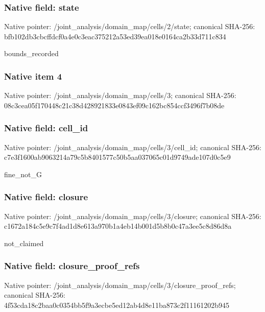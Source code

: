 \documentclass[10pt,a4paper]{article}
\begin{document}
\subsubsection{Native field: state}
Native pointer: /joint\_\allowbreak{}analysis/domain\_\allowbreak{}map/cells/2/state; canonical SHA-256: bfb102db3cbcffdcf0a4e0c3eac375212a53ed39ea018e0164ca2b33d711c834

\begingroup\raggedright\sloppy bounds\_\allowbreak{}recorded\par\endgroup

\subsubsection{Native item 4}
Native pointer: /joint\_\allowbreak{}analysis/domain\_\allowbreak{}map/cells/3; canonical SHA-256: 08c3cea05f170448c21c38d428921833e0843ef09c162bc854ccf3496f7b08de

\subsubsection{Native field: cell\_\allowbreak{}id}
Native pointer: /joint\_\allowbreak{}analysis/domain\_\allowbreak{}map/cells/3/cell\_\allowbreak{}id; canonical SHA-256: c7e3f1600ab9063214a79c5b8401577c50b5aa037065c01d9749ade107d0c5e9

\begingroup\raggedright\sloppy fine\_\allowbreak{}not\_\allowbreak{}G\par\endgroup

\subsubsection{Native field: closure}
Native pointer: /joint\_\allowbreak{}analysis/domain\_\allowbreak{}map/cells/3/closure; canonical SHA-256: c1672a184c5e9c7f4ad1d8e613a970b1a4eb14b001d5b8b0c47a3ee5c8d86d8a

\begingroup\raggedright\sloppy not\_\allowbreak{}claimed\par\endgroup

\subsubsection{Native field: closure\_\allowbreak{}proof\_\allowbreak{}refs}
Native pointer: /joint\_\allowbreak{}analysis/domain\_\allowbreak{}map/cells/3/closure\_\allowbreak{}proof\_\allowbreak{}refs; canonical SHA-256: 4f53cda18c2baa0c0354bb5f9a3ecbe5ed12ab4d8e11ba873c2f11161202b945
\end{document}
